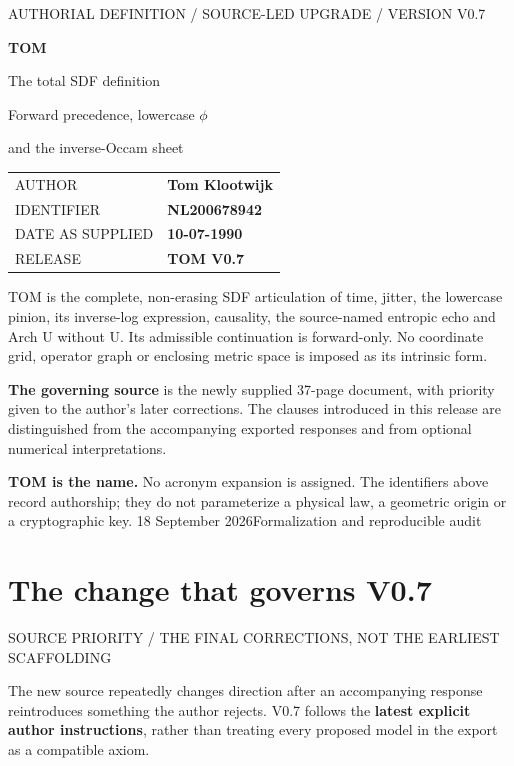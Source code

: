 \documentclass[11pt,a4paper]{article}
\newcommand{\newsec}[2]{\clearpage\section{#1}{\sffamily\footnotesize\color{teal}\MakeUppercase{#2}\par}\vspace{5pt}}
\begin{document}
\thispagestyle{empty}
{\sffamily\footnotesize\color{teal}AUTHORIAL DEFINITION / SOURCE-LED UPGRADE / VERSION V0.7\par}
\vspace{15mm}
{\sffamily\fontsize{52}{55}\selectfont\bfseries\color{ink}TOM\par}
\vspace{3mm}
{\sffamily\fontsize{25}{30}\selectfont\color{ink}The total SDF definition\par}
\vspace{4mm}
{\large Forward precedence, lowercase $\phi$\par}
{\large and the inverse-Occam sheet\par}
\vspace{11mm}
\begin{tabularx}{\linewidth}{@{}P{41mm}Y@{}}
\toprule
\sffamily\small AUTHOR & \textbf{Tom Klootwijk}\\
\sffamily\small IDENTIFIER & \textbf{NL200678942}\\
\sffamily\small DATE AS SUPPLIED & \textbf{10-07-1990}\\
\sffamily\small RELEASE & \textbf{TOM V0.7}\\
\bottomrule
\end{tabularx}
\vspace{8mm}
\begin{boxx}
TOM is the complete, non-erasing SDF articulation of time, jitter, the lowercase pinion, its inverse-log expression, causality, the source-named entropic echo and Arch U without U. Its admissible continuation is forward-only. No coordinate grid, operator graph or enclosing metric space is imposed as its intrinsic form.
\end{boxx}
\textbf{The governing source} is the newly supplied 37-page document, with priority given to the author's later corrections. The clauses introduced in this release are distinguished from the accompanying exported responses and from optional numerical interpretations.

\textbf{TOM is the name.} No acronym expansion is assigned. The identifiers above record authorship; they do not parameterize a physical law, a geometric origin or a cryptographic key.
\vfill
{\sffamily\small\color{muted}18 September 2026\hfill Formalization and reproducible audit}

\newsec{The change that governs V0.7}{Source priority / the final corrections, not the earliest scaffolding}
The new source repeatedly changes direction after an accompanying response reintroduces something the author rejects. V0.7 follows the \textbf{latest explicit author instructions}, rather than treating every proposed model in the export as a compatible axiom.
\end{document}
